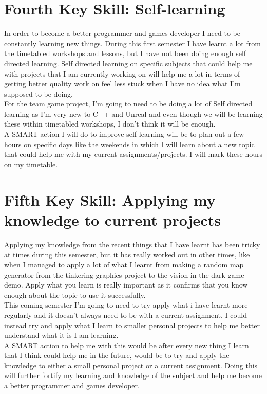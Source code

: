 \documentclass{scrartcl}
\begin{document}
\section{Fourth Key Skill: Self-learning}

In order to become a better programmer and games developer I need to be constantly learning new things. During this first semester I have learnt a lot from the timetabled workshops and lessons, but I have not been doing enough self directed learning. Self directed learning on specific subjects that could help me with projects that I am currently working on will help me a lot in terms of getting better quality work on feel less stuck when I have no idea what I'm supposed to be doing.
\\
For the team game project, I'm going to need to be doing a lot of Self directed learning as I'm very new to C++ and Unreal and even though we will be learning these within timetabled workshops, I don't think it will be enough.
\\
A SMART action I will do to improve self-learning will be to plan out a few hours on specific days like the weekends in which I will learn about a new topic that could help me with my current assignments/projects. I will mark these hours on my timetable.

\section{Fifth Key Skill: Applying my knowledge to current projects}

Applying my knowledge from the recent things that I have learnt has been tricky at times during this semester, but it has really worked out in other times, like when I managed to apply a lot of what I learnt from making a random map generator from the tinkering graphics project to the vision in the dark game demo. Apply what you learn is really important as it confirms that you know enough about the topic to use it successfully.
\\
This coming semester I'm going to need to try apply what i have learnt more regularly and it doesn't always need to be with a current assignment, I could instead try and apply what I learn to smaller personal projects to help me better understand what it is I am learning.
\\
A SMART action to help me with this would be after every new thing I learn that I think could help me in the future, would be to try and apply the knowledge to either a small personal project or a current assignment. Doing this will further fortify my learning and knowledge of the subject and help me become a better programmer and games developer.
\end{document}

